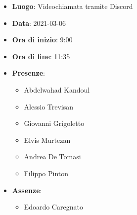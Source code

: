 \begin{itemize}
    \item \textbf{Luogo}: Videochiamata tramite Discord
    \item \textbf{Data}: 2021-03-06
    \item \textbf{Ora di inizio}: 9:00
    \item \textbf{Ora di fine}: 11:35
    \item \textbf{Presenze}:
          \begin{itemize}
            \item Abdelwahad Kandoul
            \item Alessio Trevisan
            \item Giovanni Grigoletto
            \item Elvis Murtezan
            \item Andrea De Tomasi
            \item Filippo Pinton
          \end{itemize}
    \item \textbf{Assenze}:
          \begin{itemize}
            \item Edoardo Caregnato
          \end{itemize}
\end{itemize}
